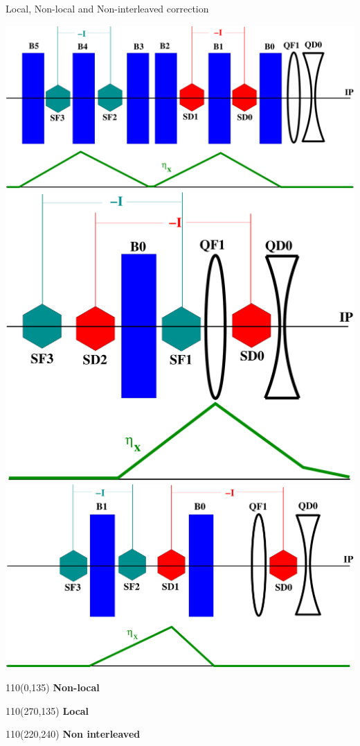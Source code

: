 \documentclass{beamer}
\begin{document}
\begin{frame}{Local, Non-local and Non-interleaved correction}
\raggedright
  \includegraphics[scale=0.12,angle=0]{nonlocalcorr.pdf}\hspace*{0.5cm}\includegraphics[scale=0.12,angle=0]{localcorr.pdf}\\
  \vspace*{0.5cm}
\centering
\includegraphics[scale=0.15,angle=0]{noninterleavedcorr.pdf}\\
  \setlength{\TPHorizModule}{1pt}
  \setlength{\TPVertModule}{1pt}
 \begin{textblock}{110}(0,135)
  \textbf{Non-local}
 \end{textblock}
  \begin{textblock}{110}(270,135)
  \textbf{Local}
 \end{textblock}
   \begin{textblock}{110}(220,240)
  \textbf{Non interleaved}
 \end{textblock}
\end{frame}
\end{document}
